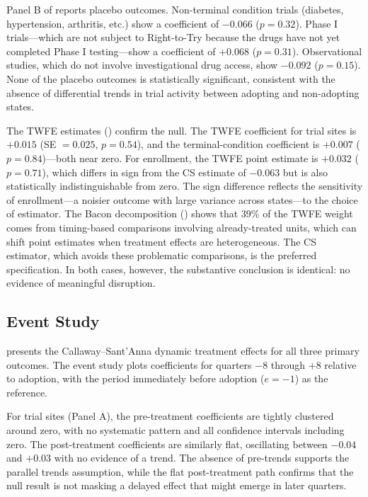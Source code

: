 \documentclass[12pt]{article}
\begin{document}
Panel B of  reports placebo outcomes. Non-terminal condition trials (diabetes, hypertension, arthritis, etc.) show a coefficient of $-0.066$ ($p = 0.32$). Phase I trials---which are not subject to Right-to-Try because the drugs have not yet completed Phase I testing---show a coefficient of $+0.068$ ($p = 0.31$). Observational studies, which do not involve investigational drug access, show $-0.092$ ($p = 0.15$). None of the placebo outcomes is statistically significant, consistent with the absence of differential trends in trial activity between adopting and non-adopting states.

The TWFE estimates () confirm the null. The TWFE coefficient for trial sites is $+0.015$ (SE $= 0.025$, $p = 0.54$), and the terminal-condition coefficient is $+0.007$ ($p = 0.84$)---both near zero. For enrollment, the TWFE point estimate is $+0.032$ ($p = 0.71$), which differs in sign from the CS estimate of $-0.063$ but is also statistically indistinguishable from zero. The sign difference reflects the sensitivity of enrollment---a noisier outcome with large variance across states---to the choice of estimator. The Bacon decomposition () shows that 39\% of the TWFE weight comes from timing-based comparisons involving already-treated units, which can shift point estimates when treatment effects are heterogeneous. The CS estimator, which avoids these problematic comparisons, is the preferred specification. In both cases, however, the substantive conclusion is identical: no evidence of meaningful disruption.

\subsection{Event Study}

 presents the Callaway--Sant'Anna dynamic treatment effects for all three primary outcomes. The event study plots coefficients for quarters $-8$ through $+8$ relative to adoption, with the period immediately before adoption ($e = -1$) as the reference.

For trial sites (Panel A), the pre-treatment coefficients are tightly clustered around zero, with no systematic pattern and all confidence intervals including zero. The post-treatment coefficients are similarly flat, oscillating between $-0.04$ and $+0.03$ with no evidence of a trend. The absence of pre-trends supports the parallel trends assumption, while the flat post-treatment path confirms that the null result is not masking a delayed effect that might emerge in later quarters.
\end{document}
